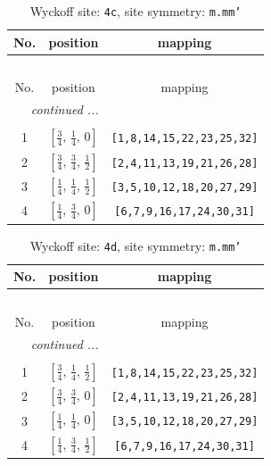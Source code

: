 \documentclass[fleqn,8pt]{jsarticle}
\begin{document}
\renewcommand{\arraystretch}{1.2}
\begin{longtable}{ccc}
\caption{Wyckoff site: {\tt 4c}, site symmetry: {\tt m.mm'}}
 \\
 \hline \hline
No. & position & mapping \\ \hline \endfirsthead

\multicolumn{2}{l}{\tablename\ \thetable{}} \\
 \hline \hline
No. & position & mapping \\ \hline \endhead

 \hline \hline
\multicolumn{2}{r}{\footnotesize\it continued ...} \\ \endfoot

 \hline \hline
\multicolumn{2}{r}{} \\ \endlastfoot

1 & $\left[ \frac{3}{4},\, \frac{1}{4},\, 0 \right]$ & {\tt [1,8,14,15,22,23,25,32]} \\ \hline
2 & $\left[ \frac{3}{4},\, \frac{3}{4},\, \frac{1}{2} \right]$ & {\tt [2,4,11,13,19,21,26,28]} \\ \hline
3 & $\left[ \frac{1}{4},\, \frac{1}{4},\, \frac{1}{2} \right]$ & {\tt [3,5,10,12,18,20,27,29]} \\ \hline
4 & $\left[ \frac{1}{4},\, \frac{3}{4},\, 0 \right]$ & {\tt [6,7,9,16,17,24,30,31]} \\
\end{longtable}
\renewcommand{\arraystretch}{1.2}
\begin{longtable}{ccc}
\caption{Wyckoff site: {\tt 4d}, site symmetry: {\tt m.mm'}}
 \\
 \hline \hline
No. & position & mapping \\ \hline \endfirsthead

\multicolumn{2}{l}{\tablename\ \thetable{}} \\
 \hline \hline
No. & position & mapping \\ \hline \endhead

 \hline \hline
\multicolumn{2}{r}{\footnotesize\it continued ...} \\ \endfoot

 \hline \hline
\multicolumn{2}{r}{} \\ \endlastfoot

1 & $\left[ \frac{3}{4},\, \frac{1}{4},\, \frac{1}{2} \right]$ & {\tt [1,8,14,15,22,23,25,32]} \\ \hline
2 & $\left[ \frac{3}{4},\, \frac{3}{4},\, 0 \right]$ & {\tt [2,4,11,13,19,21,26,28]} \\ \hline
3 & $\left[ \frac{1}{4},\, \frac{1}{4},\, 0 \right]$ & {\tt [3,5,10,12,18,20,27,29]} \\ \hline
4 & $\left[ \frac{1}{4},\, \frac{3}{4},\, \frac{1}{2} \right]$ & {\tt [6,7,9,16,17,24,30,31]} \\
\end{longtable}
\end{document}
